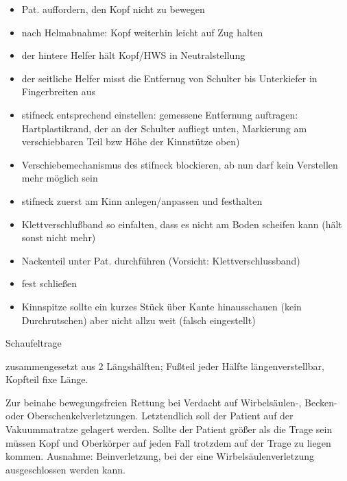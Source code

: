 \documentclass{article}
\begin{document}
\begin{itemize}
\item Pat. auffordern, den Kopf nicht zu bewegen

\item nach Helmabnahme: Kopf weiterhin leicht auf Zug halten

\item der hintere Helfer h\"alt Kopf/HWS in Neutralstellung

\item der seitliche Helfer misst die Entfernug von Schulter bis
Unterkiefer in Fingerbreiten aus

\item stifneck entsprechend einstellen: gemessene Entfernung auftragen:
Hartplastikrand, der an der Schulter aufliegt unten, Markierung am
verschiebbaren Teil bzw H\"ohe der Kinnst\"utze oben)

\item Verschiebemechanismus des stifneck blockieren, ab nun darf kein
Verstellen mehr m\"oglich  sein 

\item stifneck zuerst am Kinn anlegen/anpassen und festhalten

\item Klettverschlu{\ss}band so einfalten, dass es nicht am Boden
scheifen kann (h\"alt sonst nicht mehr)

\item Nackenteil unter Pat. durchf\"uhren (Vorsicht:
Klettverschlussband)

\item fest schlie{\ss}en

\end{itemize}
\begin{itemize}
\item[] Kinnspitze sollte ein kurzes St\"uck \"uber Kante hinausschauen
(kein Durchrutschen) aber nicht allzu weit (falsch eingestellt)

\end{itemize}
Schaufeltrage

zusammengesetzt aus 2 L\"angsh\"alften; Fu{\ss}teil jeder H\"alfte
l\"angenverstellbar, Kopfteil fixe L\"ange.

Zur beinahe bewegungsfreien Rettung bei Verdacht auf Wirbels\"aulen-,
Becken- oder Oberschenkelverletzungen. Letztendlich soll der Patient
auf der Vakuummatratze gelagert werden. Sollte der Patient gr\"o{\ss}er
als die Trage sein m\"ussen Kopf und Oberk\"orper auf jeden Fall
trotzdem auf der Trage zu liegen kommen. Ausnahme: Beinverletzung, bei
der eine Wirbels\"aulenverletzung ausgeschlossen werden kann.
\end{document}
